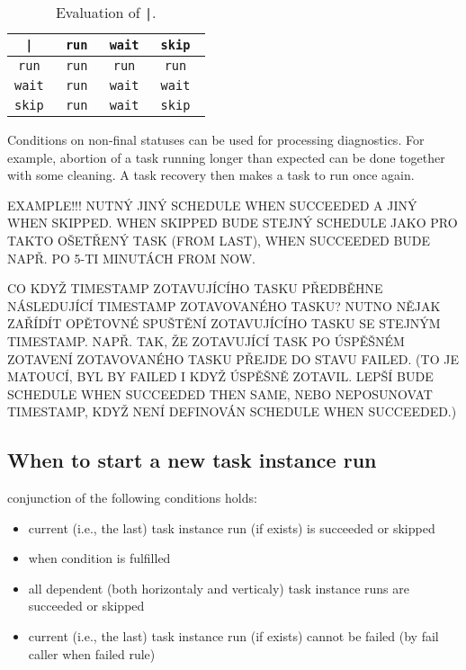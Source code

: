 \documentclass[a4paper,12pt,english,oneside]{book}
\begin{document}
\begin{table}
\centering
\begin{tabular}{c|ccc}
\toprule
\tt |    & \tt run  & \tt wait & \tt skip \\
\midrule
\tt run  & \tt run  & \tt run  & \tt run  \\
\tt wait & \tt run  & \tt wait & \tt wait \\
\tt skip & \tt run  & \tt wait & \tt skip \\
\bottomrule
\end{tabular}
\caption{Evaluation of \texttt{|}.}
\end{table}

Conditions on non-final statuses can be used for processing diagnostics. For example, abortion of a task running longer than expected can be done together with some cleaning. A task recovery then makes a task to run once again.

EXAMPLE!!! NUTNÝ JINÝ SCHEDULE WHEN SUCCEEDED A JINÝ WHEN SKIPPED. WHEN SKIPPED BUDE STEJNÝ SCHEDULE JAKO PRO TAKTO OŠETŘENÝ TASK (FROM LAST), WHEN SUCCEEDED BUDE NAPŘ. PO 5-TI MINUTÁCH FROM NOW.

CO KDYŽ TIMESTAMP ZOTAVUJÍCÍHO TASKU PŘEDBĚHNE NÁSLEDUJÍCÍ TIMESTAMP ZOTAVOVANÉHO TASKU? NUTNO NĚJAK ZAŘÍDÍT OPĚTOVNÉ SPUŠTĚNÍ ZOTAVUJÍCÍHO TASKU SE STEJNÝM TIMESTAMP. NAPŘ. TAK, ŽE ZOTAVUJÍCÍ TASK PO ÚSPĚŠNÉM ZOTAVENÍ ZOTAVOVANÉHO TASKU PŘEJDE DO STAVU FAILED. (TO JE MATOUCÍ, BYL BY FAILED I KDYŽ ÚSPĚŠNĚ ZOTAVIL. LEPŠÍ BUDE SCHEDULE WHEN SUCCEEDED THEN SAME, NEBO NEPOSUNOVAT TIMESTAMP, KDYŽ NENÍ DEFINOVÁN SCHEDULE WHEN SUCCEEDED.)


\subsection{When to start a new task instance run}
conjunction of the following conditions holds:
\begin{itemize}
\item current (i.e., the last) task instance run (if exists) is succeeded or skipped
\item when condition is fulfilled
\item all dependent (both horizontaly and verticaly) task instance runs are succeeded or skipped
\item current (i.e., the last) task instance run (if exists) cannot be failed (by fail caller when failed rule)
\end{itemize}
\end{document}
